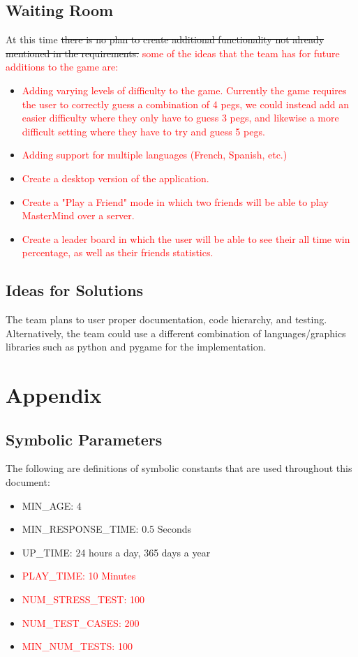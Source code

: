 \documentclass[12pt, titlepage]{article}
\begin{document}
\subsection{Waiting Room}
At this time \sout{there is no plan to create additional functionality not already mentioned in the requirements.} \textcolor{red}{some of the ideas that the team has for future additions to the game are: }
\begin{itemize}
    \item \textcolor{red}{Adding varying levels of difficulty to the game. Currently the game requires the user to correctly guess a combination of 4 pegs, we could instead add an easier difficulty where they only have to guess 3 pegs, and likewise a more difficult setting where they have to try and guess 5 pegs.}
    \item \textcolor{red}{Adding support for multiple languages (French, Spanish, etc.)}
    \item \textcolor{red}{Create a desktop version of the application.}
    \item \textcolor{red}{Create a "Play a Friend" mode in which two friends will be able to play MasterMind over a server.}
    \item \textcolor{red}{Create a leader board in which the user will be able to see their all time win percentage, as well as their friends statistics.}
\end{itemize}

\subsection{Ideas for Solutions}
The team plans to user proper documentation, code hierarchy, and testing. Alternatively, the team could use a different combination of languages/graphics libraries such as python and pygame for the implementation.

\newpage

\section{Appendix}


\subsection{Symbolic Parameters}

The following are definitions of symbolic constants that are used throughout this document:

\begin{itemize}
    \item MIN\_AGE: 4
    \item MIN\_RESPONSE\_TIME: 0.5 Seconds
    \item UP\_TIME: 24 hours a day, 365 days a year
    \item \textcolor{red}{PLAY\_TIME: 10 Minutes}
    \item \textcolor{red}{NUM\_STRESS\_TEST: 100}
    \item \textcolor{red}{NUM\_TEST\_CASES: 200}
    \item \textcolor{red}{MIN\_NUM\_TESTS: 100}
    
    
\end{itemize}
\end{document}
